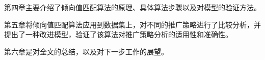 第四章主要介绍了倾向值匹配算法的原理、具体算法步骤以及对模型的验证方法。

第五章将倾向值匹配算法应用到数据集上，对不同的推广策略进行了比较分析，并提出了一种改进模型，验证了该算法对推广策略分析的适用性和准确性。

第六章是对全文的总结，以及对下一步工作的展望。




































